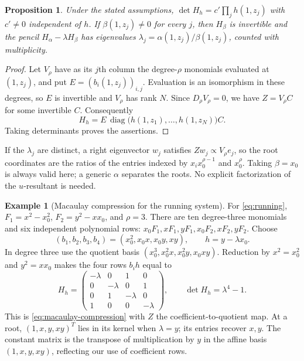 \documentclass[12pt]{article}
\DeclareMathOperator{\diag}{diag}
\newtheorem{proposition}[theorem]{Proposition}
\theoremstyle{definition}
\newtheorem{example}[theorem]{Example}
\theoremstyle{remark}
\begin{document}
\begin{proposition}\label{prop:macaulay-compression}
  Under the stated assumptions, $\det H_h=c'\prod_jh(1,z_j)$ with $c'\ne0$ independent
  of $h$. If $\beta(1,z_j)\ne0$ for every $j$, then $H_\beta$ is invertible and the pencil
  $H_\alpha-\lambda H_\beta$ has eigenvalues
  $\lambda_j=\alpha(1,z_j)/\beta(1,z_j)$, counted with multiplicity.
\end{proposition}
\begin{proof}
Let $V_\rho$ have as its $j$th column the degree-$\rho$ monomials evaluated
at $(1,z_j)$, and put $E=(b_i(1,z_j))_{i,j}$. Evaluation is an isomorphism in these degrees,
so $E$ is invertible and $V_\rho$ has rank $N$. Since $D_\rho V_\rho=0$, we have
$Z=V_\rho C$ for some invertible $C$. Consequently
\[
  H_h=E\,\diag\bigl(h(1,z_1),\ldots,h(1,z_N)\bigr)C.
\]
Taking determinants proves the assertions.
\end{proof}

If the $\lambda_j$ are distinct, a right eigenvector $w_j$ satisfies
$Zw_j\propto V_\rho e_j$, so the root coordinates are the ratios of the entries indexed
by $x_ix_0^{\rho-1}$ and $x_0^\rho$. Taking $\beta=x_0$ is always valid here; a generic
$\alpha$ separates the roots. No explicit factorization of the $u$-resultant is needed.

\begin{example}[Macaulay compression for the running system]\label{ex:macaulay-running}
  For \eqref{eq:running}, $F_1=x^2-x_0^2$, $F_2=y^2-xx_0$, and $\rho=3$.
  There are ten degree-three monomials and six independent polynomial rows:
  $x_0F_1,xF_1,yF_1,x_0F_2,xF_2,yF_2$. Choose
  \[
    (b_1,b_2,b_3,b_4)=(x_0^2,x_0x,x_0y,xy),\qquad h=y-\lambda x_0.
  \]
  In degree three use the quotient basis $(x_0^3,x_0^2x,x_0^2y,x_0xy)$.
  Reduction by $x^2=x_0^2$ and $y^2=xx_0$ makes the four rows $b_ih$ equal to
  \[
    H_h=\begin{pmatrix}
      -\lambda&0&1&0\\
      0&-\lambda&0&1\\
      0&1&-\lambda&0\\
      1&0&0&-\lambda
    \end{pmatrix},\qquad \det H_h=\lambda^4-1.
  \]
  This is \eqref{eq:macaulay-compression} with $Z$ the coefficient-to-quotient map.
  At a root, $(1,x,y,xy)^T$ lies in its kernel when $\lambda=y$; its entries recover $x,y$.
  The constant matrix is the transpose of multiplication by $y$ in the affine basis
  $(1,x,y,xy)$, reflecting our use of coefficient rows.
\end{example}
\end{document}
